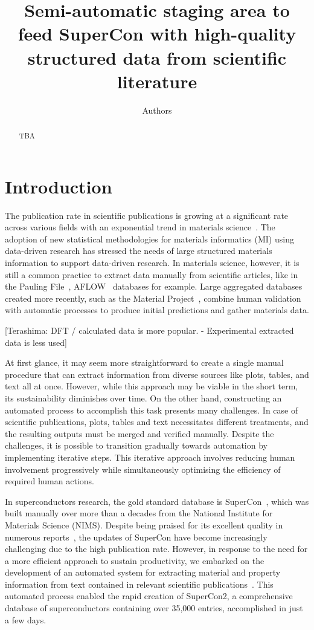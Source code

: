 \documentclass[a4paper]{article}
\title{Semi-automatic staging area to feed SuperCon with high-quality structured data from scientific literature}
\author[1]{Authors}
\begin{document}
\maketitle

\begin{abstract}
    TBA
\end{abstract}

\section{Introduction}
The publication rate in scientific publications is growing at a significant rate across various fields with an exponential trend in materials science~\cite{Pratheepan_2019}. 
The adoption of new statistical methodologies for materials informatics (MI) using data-driven research has stressed the needs of large structured materials information to support data-driven research. 
In materials science, however, it is still a common practice to extract data manually from scientific articles, like in the Pauling File~\cite{Blokhin2018ThePF_paulingFile}, AFLOW~\cite{aflowcurtarolo2012aflow} databases for example. 
Large aggregated databases created more recently, such as the Material Project~\cite{materialsprojectJain2013}, combine human validation with automatic processes to produce initial predictions and gather materials data. 

[Terashima: DFT / calculated data is more popular. - Experimental extracted data is less used]

At first glance, it may seem more straightforward to create a single manual procedure that can extract information from diverse sources like plots, tables, and text all at once. However, while this approach may be viable in the short term, its sustainability diminishes over time. 
On the other hand, constructing an automated process to accomplish this task presents many challenges. In case of scientific publications, plots, tables and text necessitates different treatments, and the resulting outputs must be merged and verified manually. Despite the challenges, it is possible to transition gradually towards automation by implementing iterative steps. This iterative approach involves reducing human involvement progressively while simultaneously optimising the efficiency of required human actions. 

In superconductors research, the gold standard database is SuperCon~\cite{SuperCon}, which was built manually over more than a decades from the National Institute for Materials Science (NIMS). 
Despite being praised for its excellent quality in numerous reports~\cite{roter2020predicting, stanev_machine_2017, tran2022machine, konno2021deep}, the updates of SuperCon have become increasingly challenging due to the high publication rate. However, in response to the need for a more efficient approach to sustain productivity, we embarked on the development of an automated system for extracting material and property information from text contained in relevant scientific publications~\cite{doi:10.1080/27660400.2022.2153633}. This automated process enabled the rapid creation of SuperCon2, a comprehensive database of superconductors containing over 35,000 entries, accomplished in just a few days. 
\end{document}

